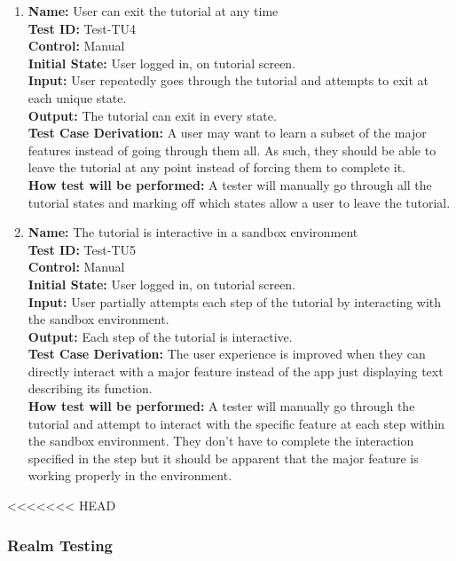 \documentclass[12pt, titlepage]{article}
\begin{document}
\begin{enumerate}
    \item
    \textbf{Name:} User can exit the tutorial at any time \label{itm:Test-TU4} \\
    \textbf{Test ID:} Test-TU4 \\
    \textbf{Control:} Manual \\
    \textbf{Initial State:} User logged in, on tutorial screen. \\
    \textbf{Input:} User repeatedly goes through the tutorial and attempts to exit at each unique state. \\
    \textbf{Output:} The tutorial can exit in every state. \\
    \textbf{Test Case Derivation:} A user may want to learn a subset of the major features instead of going through them all. As such, they should be able to leave the tutorial at any point instead of forcing them to complete it. \\
    \textbf{How test will be performed:} A tester will manually go through all the tutorial states and marking off which states allow a user to leave the tutorial.
    
    \item
    \textbf{Name:} The tutorial is interactive in a sandbox environment \label{itm:Test-TU5} \\
    \textbf{Test ID:} Test-TU5 \\
    \textbf{Control:} Manual \\
    \textbf{Initial State:} User logged in, on tutorial screen. \\
    \textbf{Input:} User partially attempts each step of the tutorial by interacting with the sandbox environment. \\
    \textbf{Output:} Each step of the tutorial is interactive. \\
    \textbf{Test Case Derivation:} The user experience is improved when they can directly interact with a major feature instead of the app just displaying text describing its function. \\
    \textbf{How test will be performed:} A tester will manually go through the tutorial and attempt to interact with the specific feature at each step within the sandbox environment. They don't have to complete the interaction specified in the step but it should be apparent that the major feature is working properly in the environment.

\end{enumerate}

<<<<<<< HEAD
\subsubsection{Realm Testing}
\end{document}
